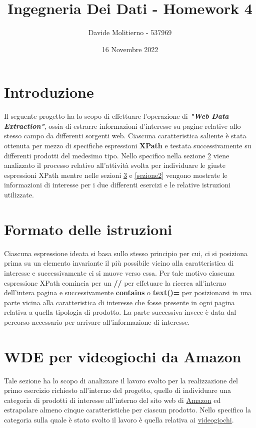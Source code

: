\documentclass[12pt, letterpaper]{article}
\title{Ingegneria Dei Dati - Homework 4}
\author{Davide Molitierno - 537969}
\date{16 Novembre 2022}
\begin{document}
\maketitle

\section{Introduzione}
Il seguente progetto ha lo scopo di effettuare l'operazione di \emph{\textbf{"Web Data Extraction"}}, ossia di estrarre informazioni d'interesse su pagine relative allo stesso campo da differenti sorgenti web. Ciascuna caratteristica saliente è stata ottenuta per mezzo di specifiche espressioni \textbf{XPath} e testata successivamente su differenti prodotti del medesimo tipo.
Nello specifico nella sezione \ref{istruzioni} viene analizzato il processo relativo all'attività svolta per individuare le giuste espressioni XPath mentre nelle sezioni \ref{sezione1} e \ref{sezione2} vengono mostrate le informazioni di interesse per i due differenti esercizi e le relative istruzioni utilizzate.
\section{Formato delle istruzioni} \label{istruzioni}
Ciascuna espressione ideata si basa sullo stesso principio per cui, ci si posiziona prima su un elemento invariante il più possibile vicino alla caratteristica di interesse e successivamente ci si muove verso essa. Per tale motivo ciascuna espressione XPath comincia per un \textbf{//} per effetuare la ricerca all'interno dell'intera pagina e successivamente \textbf{contains} o \textbf{text()=} per posizionarsi in una parte vicina alla caratteristica di interesse che fosse presente in ogni pagina relativa a quella tipologia di prodotto. La parte successiva invece è data dal percorso necessario per arrivare all'informazione di interesse.

\section{WDE per videogiochi da Amazon} \label{sezione1}
Tale sezione ha lo scopo di analizzare il lavoro svolto per la realizzazione del primo esercizio richiesto all'interno del progetto, quello di individuare una categoria di prodotti di interesse all'interno del sito web di \href{https://www.amazon.it}{Amazon} ed estrapolare almeno cinque caratteristiche per ciascun prodotto. Nello specifico la categoria sulla quale è stato svolto il lavoro è quella relativa ai \href{https://www.amazon.it/s/ref=nb_sb_noss?__mk_it_IT=ÅMÅŽÕÑ&url=search-alias%3Dvideogames&field-keywords=&crid=2GIVFOZXKUAZD&sprefix=%2Cvideogames%2C110}{videogiochi}.
\end{document}
